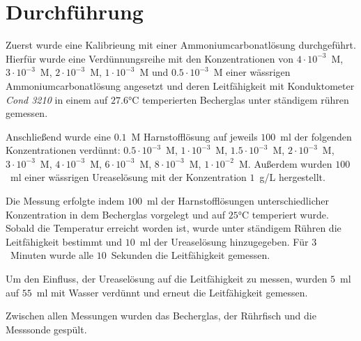 \documentclass[12pt, letterpaper]{article}
\begin{document}
\section{Durchführung}

Zuerst wurde eine Kalibrieung mit einer Ammoniumcarbonatlösung durchgeführt. Hierfür wurde eine Verdünnungsreihe mit den Konzentrationen von $4 \cdot 10^{-3}$~M, $3 \cdot 10^{-3}$~M, $2 \cdot 10^{-3}$~M, $1 \cdot 10^{-3}$~M und $0.5 \cdot 10^{-3}$~M einer wässrigen Ammoniumcarbonatlösung angesetzt und deren Leitfähigkeit mit Konduktometer \textit{Cond 3210} in einem auf $27.6$°C temperierten Becherglas unter ständigem rühren gemessen.

Anschließend wurde eine $0.1$~M Harnstofflösung auf jeweils $100$~ml der folgenden Konzentrationen verdünnt:
$0.5 \cdot 10^{-3}$~M, $1 \cdot 10^{-3}$~M, $1.5 \cdot 10^{-3}$~M, $2 \cdot 10^{-3}$~M, $3 \cdot 10^{-3}$~M, $4 \cdot 10^{-3}$~M, $6 \cdot 10^{-3}$~M, $8 \cdot 10^{-3}$~M,  $1 \cdot 10^{-2}$~M. Außerdem wurden $100$~ml einer wässrigen Ureaselösung mit der Konzentration $1$~g/L hergestellt.

Die Messung erfolgte indem $100$~ml der Harnstofflösungen unterschiedlicher Konzentration in dem Becherglas vorgelegt und auf $25$°C temperiert wurde. Sobald die Temperatur erreicht worden ist, wurde unter ständigem Rühren die Leitfähigkeit bestimmt und $10$~ml der Ureaselösung hinzugegeben. Für $3$~Minuten wurde alle $10$~Sekunden die Leitfähigkeit gemessen. 

Um den Einfluss, der Ureaselösung auf die Leitfähigkeit zu messen, wurden $5$~ml auf $55$~ml mit Wasser verdünnt und erneut die Leitfähigkeit gemessen. 

Zwischen allen Messungen wurden das Becherglas, der Rührfisch und die Messsonde gespült.
\end{document}
